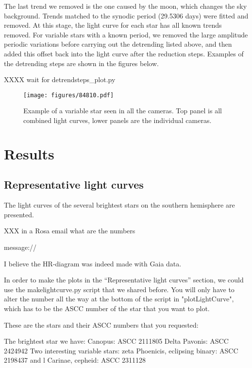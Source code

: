 \documentclass{aa}
\begin{document}
The last trend we removed is the one caused by the moon, which changes the sky background.
%
Trends matched to the synodic period (29.5306 days) were fitted and removed.
%
At this stage, the light curve for each star has all known trends removed.
%
For variable stars with a known period, we removed the large amplitude periodic variations before carrying out the detrending listed above, and then added this offset back into the light curve after the reduction steps.
%
Examples of the detrending steps are shown in the figures below.

XXXX wait for detrendsteps_plot.py

\begin{figure*}
    \centering
    \texttt{[image: figures/84810.pdf]}
    \caption{Example of a variable star seen in all the cameras.
    Top panel is all combined light curves, lower panels are the individual cameras.}
    \label{fig:cleaned_output}
\end{figure*}

\section{Results}
\label{sec:results}

\subsection{Representative light curves}
The light curves of the several brightest stars on the southern hemisphere are presented.

XXX in a Rosa email what are the numbers

message://%

I believe the HR-diagram was indeed made with Gaia data.

In order to make the plots in the ``Representative light curves'' section, we could use the makelightcurve.py script that we shared before. You will only have to alter the number all the way at the bottom of the script in "plotLightCurve", which has to be the ASCC number of the star that you want to plot.

These are the stars and their ASCC numbers that you requested:

The brightest star we have: Canopus: ASCC 2111805
Delta Pavonis: ASCC 2424942
Two interesting variable stars: zeta Phoenicis, eclipsing binary: ASCC 2198437
and l Carinae, cepheid: ASCC 2311128
\end{document}
